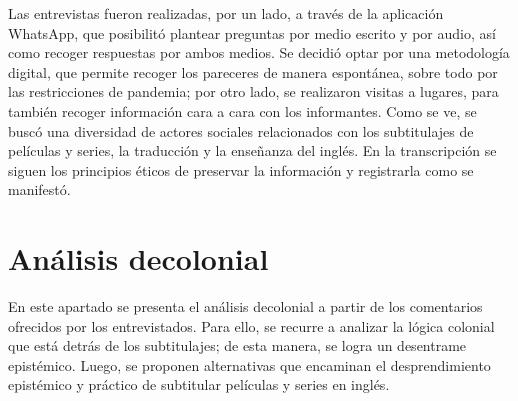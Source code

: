 \documentclass[spanish]{textolivre}
\begin{document}
Las entrevistas fueron realizadas, por un lado, a través de la aplicación WhatsApp, que posibilitó plantear preguntas por medio escrito y por audio, así como recoger respuestas por ambos medios. Se decidió optar por una metodología digital, que permite recoger los pareceres de manera espontánea, sobre todo por las restricciones de pandemia; por otro lado, se realizaron visitas a lugares, para también recoger información cara a cara con los informantes.  Como se ve, se buscó una diversidad de actores sociales relacionados con los subtitulajes de películas y series, la traducción y la enseñanza del inglés. En la transcripción se siguen los principios éticos de preservar la información y registrarla como se manifestó.


\section{Análisis decolonial}

En este apartado se presenta el análisis decolonial a partir de los comentarios ofrecidos por los entrevistados. Para ello, se recurre a analizar la lógica colonial que está detrás de los subtitulajes; de esta manera, se logra un desentrame epistémico. Luego, se proponen alternativas que encaminan el desprendimiento epistémico y práctico de subtitular películas y series en inglés.
\end{document}

